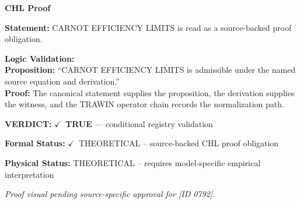 \vspace{0.45em}
\noindent\textbf{CHL Proof}\par
\textbf{Statement:} CARNOT EFFICIENCY LIMITS is read as a source-backed proof obligation.

\textbf{Logic Validation:}\\
\textbf{Proposition:} ``CARNOT EFFICIENCY LIMITS is admissible under the named source equation and derivation.''\\
\textbf{Proof:} The canonical statement supplies the proposition, the derivation supplies the witness, and the TRAWIN operator chain records the normalization path.

\textbf{VERDICT:} \ensuremath{\checkmark}\ \textbf{TRUE} --- conditional registry validation

\textbf{Formal Status:} \ensuremath{\checkmark}\ THEORETICAL -- source-backed CHL proof obligation

\textbf{Physical Status:} THEORETICAL -- requires model-specific empirical interpretation
\par\vspace{0.45em}
\par
\vfill
\begingroup\footnotesize\itshape
Proof visual pending source-specific approval for [ID 0792].
\par\endgroup
\vfill
\endgroup
\endgroup
